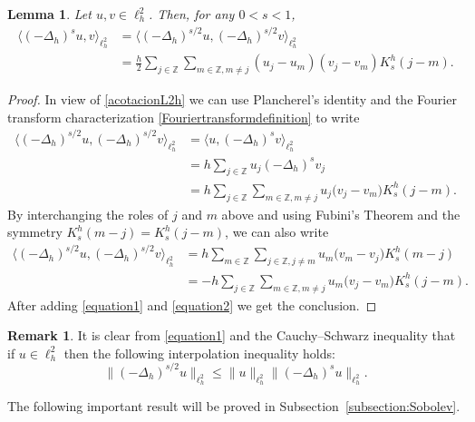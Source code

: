 \documentclass[a4paper,11pt,reqno]{amsart}
\newcommand{\Z}{\mathbb{Z}}
\newtheorem{lem}[thm]{Lemma}
\theoremstyle{definition}
\newtheorem{rem}[thm]{Remark}
\numberwithin{equation}{section}
\begin{document}
\begin{lem}
\label{lemmaquefalta}
Let $u,v\in\ell^2_h$. Then, for any $0<s<1$,
\begin{align*}
\langle(-\Delta_h)^{s}u,v\rangle_{\ell^2_h} 
&= \langle(-\Delta_h)^{s/2}u,(-\Delta_h)^{s/2}v\rangle_{\ell^2_h} \\
&= \frac{h}{2}\sum_{j\in\Z}\sum_{m\in\Z,m\neq j}(u_j-u_m)(v_j-v_m)K^h_s(j-m).
\end{align*}
\end{lem}

\begin{proof}
In view of \eqref{acotacionL2h} we can use Plancherel's identity
and the Fourier transform characterization \eqref{Fouriertransformdefinition} to write
\begin{equation}
\label{equation1}
\begin{aligned}
\langle(-\Delta_h)^{s/2}u,(-\Delta_h)^{s/2}v\rangle_{\ell^2_h}
&=\langle u,(-\Delta_h)^{s}v\rangle_{\ell^2_h} \\
&=h\sum_{j\in\Z}u_j(-\Delta_h)^{s}v_j \\
&=h\sum_{j\in\Z}\sum_{m\in\Z,m\neq j}u_j\big(v_j-v_m\big)K_s^h(j-m).
\end{aligned}
\end{equation}
By interchanging the roles of $j$ and $m$ above and using
Fubini's Theorem and the symmetry $K_s^h(m-j)=K_s^h(j-m)$,
we can also write
\begin{equation}
\label{equation2}
\begin{aligned}
\langle(-\Delta_h)^{s/2}u,(-\Delta_h)^{s/2}v\rangle_{\ell^2_h}
&=h\sum_{m\in\Z}\sum_{j\in\Z,j\neq m}u_m\big(v_m-v_j\big)K_s^h(m-j) \\
&=-h\sum_{j\in\Z}\sum_{m\in\Z,m\neq j}u_m\big(v_j-v_m\big)K_s^h(j-m).
\end{aligned}
\end{equation}
After adding \eqref{equation1} and \eqref{equation2} we get the conclusion.
\end{proof}

\begin{rem}
It is clear from \eqref{equation1} and the Cauchy--Schwarz inequality that
if $u\in\ell^2_h$ then the following interpolation inequality holds:
$$
\|(-\Delta_h)^{s/2}u\|_{\ell^2_h}\leq\|u\|_{\ell^2_h}\|(-\Delta_h)^su\|_{\ell^2_h}.
$$
\end{rem}

The following important result will be proved in Subsection~\ref{subsection:Sobolev}.
\end{document}

